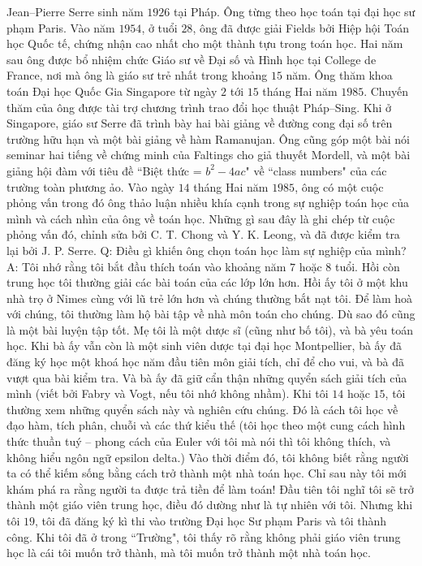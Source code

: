 \begin{multicols}{2}
	Jean--Pierre Serre sinh năm $1926$ tại Pháp. Ông từng theo học toán tại đại học sư phạm Paris. Vào năm $1954$, ở tuổi $28$, ông đã được giải Fields bởi Hiệp hội Toán học Quốc tế, chứng nhận cao nhất cho một thành tựu trong toán học. Hai năm sau ông được bổ nhiệm chức Giáo sư về Đại số và Hình học tại College de France, nơi mà ông là giáo sư trẻ nhất trong khoảng $15$ năm. Ông thăm khoa toán Đại học Quốc Gia Singapore từ ngày $2$ tới $15$ tháng Hai năm $1985$. Chuyến thăm của ông được tài trợ chương trình trao đổi học thuật Pháp--Sing. Khi ở Singapore, giáo sư Serre đã trình bày hai bài giảng về đường cong đại số trên trường hữu hạn và một bài giảng về hàm Ramanujan. Ông cũng góp một bài nói seminar hai tiếng về chứng minh của Faltings cho giả thuyết Mordell, và một bài giảng hội đàm với tiêu đề ``Biệt thức = $b^2-4ac$" về ``class numbers" của các trường toàn phương ảo. Vào ngày $14$ tháng Hai năm $1985$, ông có một cuộc phỏng vấn trong đó ông thảo luận nhiều khía cạnh trong sự nghiệp toán học của mình và cách nhìn của ông về toán học. Những gì sau đây là ghi chép từ cuộc phỏng vấn đó, chỉnh sửa bởi C. T. Chong và Y. K. Leong, và đã được kiểm tra lại bởi J. P. Serre.
	Q: Điều gì khiến ông chọn toán học làm sự nghiệp của mình?
	\vskip 0.1cm
	A: Tôi nhớ rằng tôi bắt đầu thích toán vào khoảng năm $7$ hoặc $8$ tuổi. Hồi còn trung học tôi thường giải các bài toán của các lớp lớn hơn. Hồi ấy tôi ở một khu nhà trọ ở Nimes cùng với lũ trẻ lớn hơn và chúng thường bắt nạt tôi. Để làm hoà với chúng, tôi thường làm hộ bài tập về nhà môn toán cho chúng. Dù sao đó cũng là một bài luyện tập tốt.
	\vskip 0.1cm
	Mẹ tôi là một dược sĩ (cũng như bố tôi), và bà yêu toán học. Khi bà ấy vẫn còn là một sinh viên dược tại đại học Montpellier, bà ấy đã đăng ký học một khoá học năm đầu tiên môn giải tích, chỉ để cho vui, và bà đã vượt qua bài kiểm tra. Và bà ấy đã giữ cẩn thận những quyển sách giải tích của mình (viết bởi Fabry và Vogt, nếu tôi nhớ không nhầm). Khi tôi $14$ hoặc $15$, tôi thường xem những quyển sách này và nghiên cứu chúng. Đó là cách tôi học về đạo hàm, tích phân, chuỗi và các thứ kiểu thế (tôi học theo một cung cách hình thức thuần tuý -- phong cách của Euler với tôi mà nói thì tôi không thích, và không hiểu ngôn ngữ epsilon delta.) Vào thời điểm đó, tôi không biết rằng người ta có thể kiếm sống bằng cách trở thành một nhà toán học. Chỉ sau này tôi mới khám phá ra rằng người ta được trả tiền để làm toán! Đầu tiên tôi nghĩ tôi sẽ trở thành một giáo viên trung học, điều đó dường như là tự nhiên với tôi. Nhưng khi tôi $19$, tôi đã đăng ký kì thi vào trường Đại học Sư phạm Paris và tôi thành công. Khi tôi đã ở trong ``Trường", tôi thấy rõ rằng không phải giáo viên trung học là cái tôi muốn trở thành, mà tôi muốn trở thành một nhà toán học.

\end{multicols}
